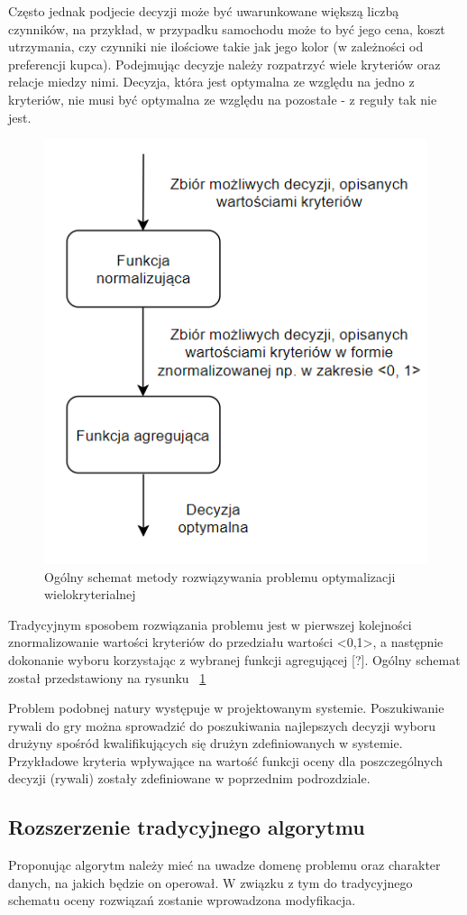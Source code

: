 Często jednak podjecie decyzji może być uwarunkowane większą liczbą czynników, na przykład, w przypadku samochodu może to być jego cena, koszt utrzymania, czy czynniki nie ilościowe takie jak jego kolor (w zależności od preferencji kupca). Podejmując decyzje należy rozpatrzyć wiele kryteriów oraz relacje miedzy nimi. Decyzja, która jest optymalna ze względu na jedno z kryteriów, nie musi być optymalna ze względu na pozostałe - z reguły tak nie jest.

\begin{figure}[ht]
\centering
\includegraphics[width=0.5\linewidth]{03-koncept/rys/tradycyjne-algorytmy-opt.PNG}
\caption{Ogólny schemat metody rozwiązywania problemu optymalizacji wielokryterialnej}
\label{fig:diagram-trad-alg-opt}
\end{figure}

Tradycyjnym sposobem rozwiązania problemu jest w pierwszej kolejności znormalizowanie wartości kryteriów do przedziału wartości <0,1>, a następnie dokonanie wyboru korzystając z wybranej funkcji agregującej [?]. Ogólny schemat został przedstawiony na rysunku ~\ref{fig:diagram-trad-alg-opt}

Problem podobnej natury występuje w projektowanym systemie. Poszukiwanie rywali do gry można sprowadzić do poszukiwania najlepszych decyzji wyboru drużyny spośród kwalifikujących się drużyn zdefiniowanych w systemie. Przykładowe kryteria wpływające na wartość funkcji oceny dla poszczególnych decyzji (rywali) zostały zdefiniowane w poprzednim podrozdziale.

\subsection{Rozszerzenie tradycyjnego algorytmu}

Proponując algorytm należy mieć na uwadze domenę problemu oraz charakter danych, na jakich będzie on operował. W związku z tym do tradycyjnego schematu oceny rozwiązań zostanie wprowadzona modyfikacja.

